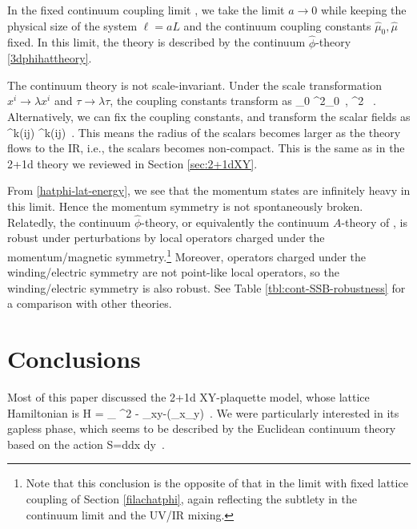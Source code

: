 \documentclass[12pt]{article}
\numberwithin{equation}{section}
\begin{document}
In the fixed continuum coupling limit \cite{paper2}, we take the limit $a\rightarrow 0$ while keeping the physical size of the system $\ell=aL$ and the continuum coupling constants $\hat\mu_0,\hat\mu$ fixed. In this limit, the theory is described by the continuum $\hat\phi$-theory \eqref{3dphihattheory}.

The continuum theory is not scale-invariant. Under the scale transformation $x^i \rightarrow \lambda x^i$ and $\tau \rightarrow \lambda \tau$, the coupling constants transform as
\ie
\hat \mu_0 \rightarrow \lambda^2\hat \mu_0~, \qquad \hat \mu \rightarrow \lambda^2 \hat \mu~.
\fe
Alternatively, we can fix the coupling constants, and transform the scalar fields as
\ie
\hat \phi^{k(ij)} \rightarrow \lambda \hat \phi^{k(ij)}~.
\fe
This means the radius of the scalars becomes larger as the theory flows to the IR, i.e., the scalars becomes non-compact. This is the same as in the 2+1d theory we reviewed in Section \ref{sec:2+1dXY}.


From \eqref{hatphi-lat-energy}, we see that the momentum states are infinitely heavy in this limit. Hence the momentum symmetry is not spontaneously broken. Relatedly, the continuum $\hat \phi$-theory, or equivalently the continuum $A$-theory of \cite{paper2}, is robust under perturbations by local operators charged under the momentum/magnetic symmetry.\footnote{Note that this conclusion is the opposite of that in the limit with fixed lattice coupling of Section \ref{filachatphi}, again reflecting the subtlety in the continuum limit and the UV/IR mixing.}
Moreover, operators charged under the winding/electric symmetry are not point-like local operators, so the winding/electric symmetry is also robust. See Table \ref{tbl:cont-SSB-robustness} for a comparison with other theories.

\section{Conclusions}\label{conclusions}


Most of this paper discussed the 2+1d XY-plaquette model, whose lattice Hamiltonian is \cite{PhysRevB.66.054526}
\ie\label{eq:iH_XY_plaqC}
H  = {  } \sum_{} \pi^2 - { }\sum_{xy-}\cos(\Delta_x\Delta_y\phi)~.
\fe
We were particularly interested in its gapless phase, which seems to be described by the Euclidean continuum theory based on the action \cite{PhysRevB.66.054526}
\ie\label{eq:i action_continuumC}
S=\int d\tau dx dy~.
\fe
\end{document}
